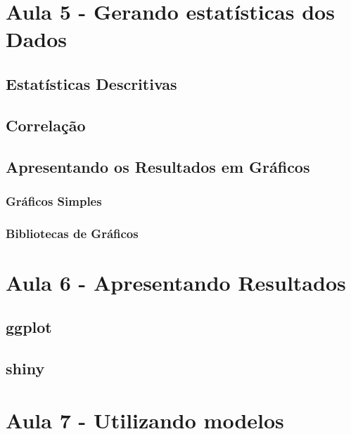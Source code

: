 \documentclass[12pt,a4paper,oneside]{erdc}
\begin{document}
\chapter{Aula 5 - Gerando estatísticas dos Dados}

	\section{Estatísticas Descritivas}
	
	\section{Correlação}
	
	\section{Apresentando os Resultados em Gráficos}
	
		\subsection{Gráficos Simples}
		
		\subsection{Bibliotecas de Gráficos}






%
%

\chapter{Aula 6 - Apresentando Resultados}

	\section{ggplot}

	\section{shiny}




%
%

\chapter{Aula 7 - Utilizando modelos}
\end{document}
